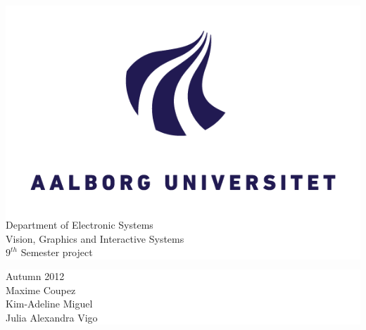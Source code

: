 \begin{titlepage}
	    \noindent \colorbox{white}{
 \begin{minipage}[b]{6.5cm}
	  \includegraphics{figures/aau_new_logo} \\
	    \small { Department of Electronic Systems} \\
 {\small Vision, Graphics and Interactive Systems}  \\
 {\small $9^{th}$ Semester project}
	  \end{minipage}
	  } 
	  \hfill  
	\colorbox{white}{ 
	 \begin{minipage}[b]{3.5cm}	 
\flushright
	  {\large Autumn 2012} \\
	     {\small Maxime Coupez}\\
   {\small Kim-Adeline Miguel}\\
   {\small Julia Alexandra Vigo}
\end{minipage}
}

  
	
\end{titlepage}
\clearpage

